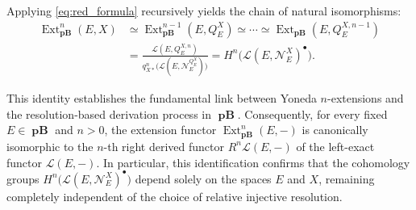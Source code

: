 \documentclass[12pt,a4paper]{amsproc}
\theoremstyle{remark}
\theoremstyle{definition}
\newcommand{\Ext}{\operatorname{Ext}}
\newcommand{\pBan}{\operatorname{\textbf{pB}}}
\numberwithin{equation}{section}
\begin{document}
Applying \eqref{eq:red_formula} recursively yields the chain of natural isomorphisms:
\begin{align*}
	\Ext^{n}_{\boldsymbol{\pBan}}(E,X) &\simeq \Ext^{n-1}_{\boldsymbol{\pBan}}(E,Q_E^X) \simeq \cdots \simeq \Ext_{\boldsymbol{\pBan}}(E,Q_E^{X,n-1}) \\
	&= \frac{\mathcal{L}(E,Q_E^{X,n})}{q_{X*}^n\big(\mathcal{L}(E, \mathcal{N}_E^{Q_E^X})\big)} = H^n\big(\mathcal{L}(E,\mathcal{N}_E^X)^{\bullet}\big).
\end{align*}

This identity establishes the fundamental link between Yoneda $n$-extensions and the resolution-based derivation process in $\boldsymbol{\pBan}$. Consequently, for every fixed $E \in \boldsymbol{\pBan}$ and $n > 0$, the extension functor $\Ext^n_{\boldsymbol{\pBan}}(E,-)$ is canonically isomorphic to the $n$-th right derived functor $R^n\mathcal{L}(E,-)$ of the left-exact functor $\mathcal{L}(E,-)$. In particular, this identification confirms that the cohomology groups $H^n\big(\mathcal{L}(E,\mathcal{N}_E^X)^{\bullet}\big)$ depend solely on the spaces $E$ and $X$, remaining completely independent of the choice of relative injective resolution.
\end{document}
